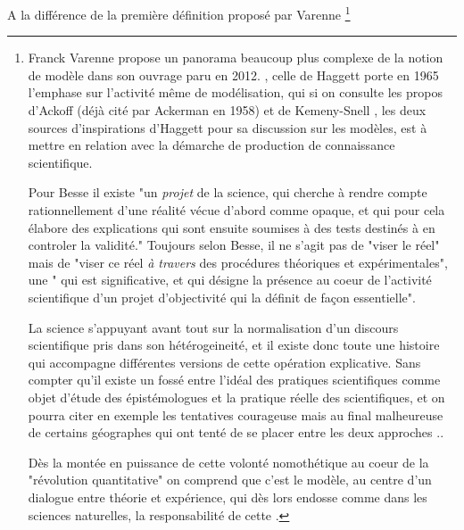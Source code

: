 A la différence de la première définition proposé par Varenne \footnote{Franck Varenne propose un panorama beaucoup plus complexe de la notion de modèle dans son ouvrage  paru en 2012. \autocite{Varenne2012}, celle de Haggett porte en 1965 l'emphase sur l'activité même de modélisation, qui si on consulte les propos d'Ackoff \autocite{Ackoff1962} (déjà cité par Ackerman en 1958) et de Kemeny-Snell \autocite{Kemeny1962}, les deux sources d'inspirations d'Haggett \autocite[106]{Berry1963} pour sa discussion sur les modèles, est à mettre en relation avec la démarche de production de connaissance scientifique.


Pour Besse \autocite{Besse2000}  il existe "un \textit{projet} de la science, qui cherche à rendre compte rationnellement d'une réalité vécue d'abord comme opaque, et qui pour cela élabore des explications qui sont ensuite soumises à des tests destinés à en controler la validité." Toujours selon Besse, il ne s'agit pas de "viser le réel" mais de "viser ce réel \textit{à travers} des procédures théoriques et expérimentales", une " qui est significative, et qui désigne la présence au coeur de l'activité scientifique d'un projet d'objectivité qui la définit de façon essentielle".

La science s'appuyant avant tout sur la normalisation d'un discours scientifique pris dans son hétérogeineité, et il existe donc toute une histoire qui accompagne différentes versions de cette opération explicative. \autocite{Besse2000} Sans compter qu'il existe un fossé entre l'idéal des pratiques scientifiques comme objet d'étude des épistémologues et la pratique réelle des scientifiques, et on pourra citer en exemple les tentatives courageuse \autocite{Harvey1969} mais au final malheureuse \autocite{Gale1972} de certains géographes qui ont tenté de se placer entre les deux approches ..

Dès la montée en puissance de cette volonté nomothétique au coeur de la "révolution quantitative" on comprend que c'est le modèle, au centre d'un dialogue entre théorie et expérience, qui dès lors endosse comme dans les sciences naturelles, la responsabilité de cette .

}
